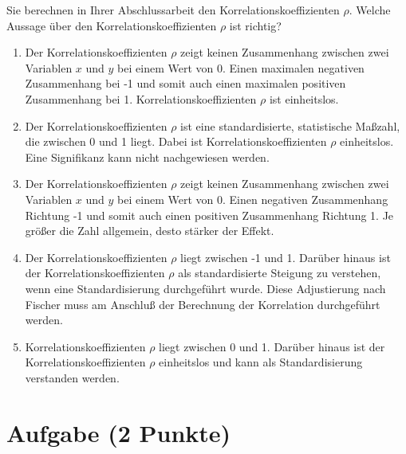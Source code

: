 \documentclass[a4paper, 9pt]{scrartcl}\usepackage[]{graphicx}\usepackage[]{xcolor}
\begin{document}
Sie berechnen in Ihrer Abschlussarbeit den Korrelationskoeffizienten $\rho$. Welche Aussage über den Korrelationskoeffizienten $\rho$ ist richtig?




\begin{enumerate}
\item [\textbf{A} \msquare] Der Korrelationskoeffizienten $\rho$ zeigt keinen Zusammenhang zwischen zwei Variablen $x$ und $y$ bei einem Wert von 0. Einen maximalen negativen Zusammenhang bei -1 und somit auch einen maximalen positiven Zusammenhang bei 1. Korrelationskoeffizienten $\rho$ ist einheitslos.
\item [\textbf{B} \msquare] Der Korrelationskoeffizienten $\rho$ ist eine standardisierte, statistische Maßzahl, die zwischen 0 und 1 liegt. Dabei ist Korrelationskoeffizienten $\rho$ einheitslos. Eine Signifikanz kann nicht nachgewiesen werden.
\item [\textbf{C} \msquare] Der Korrelationskoeffizienten $\rho$ zeigt keinen Zusammenhang zwischen zwei Variablen $x$ und $y$ bei einem Wert von 0. Einen negativen Zusammenhang Richtung -1 und somit auch einen positiven Zusammenhang Richtung 1. Je größer die Zahl allgemein, desto stärker der Effekt.
\item [\textbf{D} \msquare] Der Korrelationskoeffizienten $\rho$ liegt zwischen -1 und 1. Darüber hinaus ist der Korrelationskoeffizienten $\rho$ als standardisierte Steigung zu verstehen, wenn eine Standardisierung durchgeführt wurde. Diese Adjustierung nach Fischer muss am Anschluß der Berechnung der Korrelation durchgeführt werden.
\item [\textbf{E} \msquare] Korrelationskoeffizienten $\rho$ liegt zwischen 0 und 1. Darüber hinaus ist der Korrelationskoeffizienten $\rho$ einheitslos und kann als Standardisierung verstanden werden.
\end{enumerate}

\section{Aufgabe \hfill (2 Punkte)}

\ifcollection
\begin{flushright}
\tiny\vspace{-2Ex}
\textbf{\examinhaltstart}
\exammodulebiostat
\vspace{-1Ex}
\end{flushright}
\fi
\end{document}
